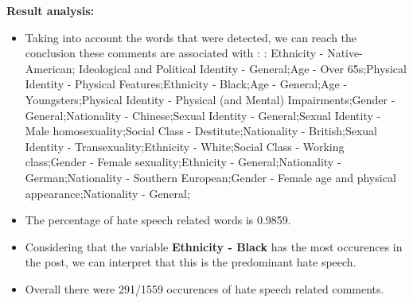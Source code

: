 \documentclass[11pt]{article}
\begin{document}
\textbf{\Large Result analysis:}

\begin{itemize}\item Taking into account the words that were detected, we can reach the conclusion these comments are associated with : : Ethnicity - Native-American; Ideological and Political Identity - General;Age - Over 65s;Physical Identity - Physical Features;Ethnicity - Black;Age - General;Age - Youngsters;Physical Identity - Physical (and Mental) Impairments;Gender - General;Nationality - Chinese;Sexual Identity - General;Sexual Identity - Male homosexuality;Social Class - Destitute;Nationality - British;Sexual Identity - Transexuality;Ethnicity - White;Social Class - Working class;Gender - Female sexuality;Ethnicity - General;Nationality - German;Nationality - Southern European;Gender - Female age and physical appearance;Nationality - General;%

\item The percentage of hate speech related words is 0.9859.

\item Considering that the variable \textbf{Ethnicity - Black} has the most occurences in the post, we can interpret that this is the predominant hate speech.

\item Overall there were 291/1559 occurences of hate speech related comments.\end{itemize}
\end{document}
